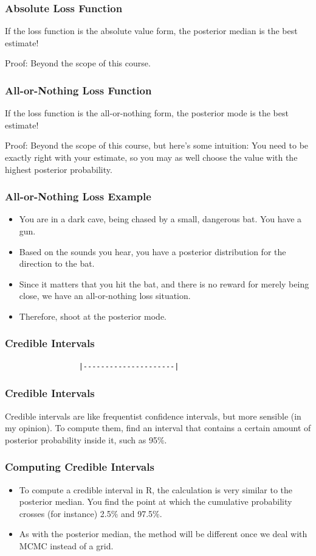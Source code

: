 \documentclass{beamer}
\begin{document}
\begin{frame}
\frametitle{Absolute Loss Function}
If the loss function is the absolute value form,
the posterior median is the best estimate!\pause

Proof: Beyond the scope of this course.
\end{frame}


\begin{frame}
\frametitle{All-or-Nothing Loss Function}
If the loss function is the all-or-nothing form,
the posterior mode is the best estimate!\pause

Proof: Beyond the scope of this course, but here's some intuition:
You need to be exactly right with your estimate, so you may as well
choose the value with the highest posterior probability.
\end{frame}


\begin{frame}
\frametitle{All-or-Nothing Loss Example}
\begin{itemize}
\item You are in a dark cave, being chased by a small, dangerous bat. You have
a gun.\pause
\item Based on the sounds you hear, you have a posterior distribution for the
direction to the bat.\pause
\item Since it matters that you hit the bat, and there is no reward for
merely being close, we have an all-or-nothing loss situation.\pause
\item Therefore, shoot at the posterior mode.
\end{itemize}


\end{frame}


\begin{frame}[fragile]
\frametitle{Credible Intervals}
\begin{verbatim}
                 |---------------------|
\end{verbatim}

\end{frame}


\begin{frame}[fragile]
\frametitle{Credible Intervals}
Credible intervals are like frequentist confidence intervals, but more sensible
(in my opinion). To compute them, find an interval that contains a certain
amount of posterior probability inside it, such as 95\%.

\end{frame}


\begin{frame}[fragile]
\frametitle{Computing Credible Intervals}
\begin{itemize}
\item To compute a credible interval in R, the calculation is very similar to the
posterior median. You find the point at which the cumulative probability
crosses (for instance) 2.5\% and 97.5\%.\pause
\item As with the posterior median, the method will be different once we
deal with MCMC instead of a grid.
\end{itemize}

\end{frame}
\end{document}
